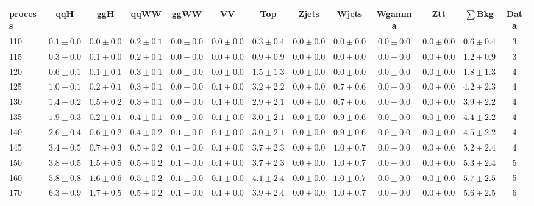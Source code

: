\begin{table}
{%
 \tiny
 \begin{center}
 \begin{tabular}{l | c c | c c c c c c c c  | c c}
 \hline
 process & qqH & ggH & qqWW & ggWW & VV & Top & Zjets & Wjets & Wgamma & Ztt & $\sum$Bkg & Data \\
 \hline
110 & $0.1\pm0.0$ & $0.0\pm0.0$ & $0.2\pm0.1$ & $0.0\pm0.0$ & $0.0\pm0.0$ & $0.3\pm0.4$ & $0.0\pm0.0$ & $0.0\pm0.0$ & $0.0\pm0.0$ & $0.0\pm0.0$ & $0.6\pm0.4$ & 3 \\
115 & $0.3\pm0.0$ & $0.1\pm0.0$ & $0.2\pm0.1$ & $0.0\pm0.0$ & $0.0\pm0.0$ & $0.9\pm0.9$ & $0.0\pm0.0$ & $0.0\pm0.0$ & $0.0\pm0.0$ & $0.0\pm0.0$ & $1.2\pm0.9$ & 3 \\
120 & $0.6\pm0.1$ & $0.1\pm0.1$ & $0.3\pm0.1$ & $0.0\pm0.0$ & $0.0\pm0.0$ & $1.5\pm1.3$ & $0.0\pm0.0$ & $0.0\pm0.0$ & $0.0\pm0.0$ & $0.0\pm0.0$ & $1.8\pm1.3$ & 4 \\
125 & $1.0\pm0.1$ & $0.2\pm0.1$ & $0.3\pm0.1$ & $0.0\pm0.0$ & $0.1\pm0.0$ & $3.2\pm2.2$ & $0.0\pm0.0$ & $0.7\pm0.6$ & $0.0\pm0.0$ & $0.0\pm0.0$ & $4.2\pm2.3$ & 4 \\
130 & $1.4\pm0.2$ & $0.5\pm0.2$ & $0.3\pm0.1$ & $0.0\pm0.0$ & $0.1\pm0.0$ & $2.9\pm2.1$ & $0.0\pm0.0$ & $0.7\pm0.6$ & $0.0\pm0.0$ & $0.0\pm0.0$ & $3.9\pm2.2$ & 4 \\
135 & $1.9\pm0.3$ & $0.2\pm0.1$ & $0.4\pm0.1$ & $0.0\pm0.0$ & $0.1\pm0.0$ & $3.0\pm2.1$ & $0.0\pm0.0$ & $0.9\pm0.6$ & $0.0\pm0.0$ & $0.0\pm0.0$ & $4.4\pm2.2$ & 4 \\
140 & $2.6\pm0.4$ & $0.6\pm0.2$ & $0.4\pm0.2$ & $0.1\pm0.0$ & $0.1\pm0.0$ & $3.0\pm2.1$ & $0.0\pm0.0$ & $0.9\pm0.6$ & $0.0\pm0.0$ & $0.0\pm0.0$ & $4.5\pm2.2$ & 4 \\
145 & $3.4\pm0.5$ & $0.7\pm0.3$ & $0.5\pm0.2$ & $0.1\pm0.0$ & $0.1\pm0.0$ & $3.7\pm2.3$ & $0.0\pm0.0$ & $1.0\pm0.7$ & $0.0\pm0.0$ & $0.0\pm0.0$ & $5.2\pm2.4$ & 4 \\
150 & $3.8\pm0.5$ & $1.5\pm0.5$ & $0.5\pm0.2$ & $0.1\pm0.0$ & $0.1\pm0.0$ & $3.7\pm2.3$ & $0.0\pm0.0$ & $1.0\pm0.7$ & $0.0\pm0.0$ & $0.0\pm0.0$ & $5.3\pm2.4$ & 5 \\
160 & $5.8\pm0.8$ & $1.6\pm0.6$ & $0.5\pm0.2$ & $0.1\pm0.0$ & $0.1\pm0.0$ & $4.1\pm2.4$ & $0.0\pm0.0$ & $1.0\pm0.7$ & $0.0\pm0.0$ & $0.0\pm0.0$ & $5.7\pm2.5$ & 5 \\
170 & $6.3\pm0.9$ & $1.7\pm0.5$ & $0.5\pm0.2$ & $0.1\pm0.0$ & $0.1\pm0.0$ & $3.9\pm2.4$ & $0.0\pm0.0$ & $1.0\pm0.7$ & $0.0\pm0.0$ & $0.0\pm0.0$ & $5.6\pm2.5$ & 6 \\

\end{tabular}
\end{center}}
\end{table}
